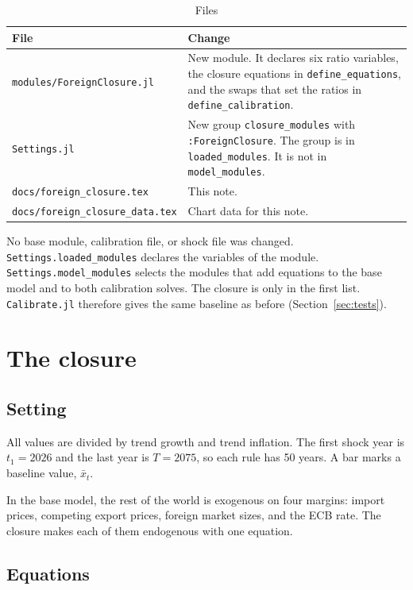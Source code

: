\documentclass[11pt,a4paper]{article}
\newcommand{\code}[1]{\texttt{#1}}
\begin{document}
\begin{table}[H]
\centering
\small
\caption{Files}
\label{tab:files}
\begin{tabular}{@{}lp{9.6cm}@{}}
\toprule
File & Change \\
\midrule
\code{modules/ForeignClosure.jl} & New module. It declares six ratio variables, the closure equations in \code{define\_equations}, and the swaps that set the ratios in \code{define\_calibration}. \\[2pt]
\code{Settings.jl} & New group \code{closure\_modules} with \code{:ForeignClosure}. The group is in \code{loaded\_modules}. It is not in \code{model\_modules}. \\[2pt]
\code{docs/foreign\_closure.tex} & This note. \\[2pt]
\code{docs/foreign\_closure\_data.tex} & Chart data for this note. \\
\bottomrule
\end{tabular}
\end{table}

No base module, calibration file, or shock file was changed.
\code{Settings.loaded\_modules} declares the variables of the module. \code{Settings.model\_modules} selects the modules that add equations to the base model and to both calibration solves. The closure is only in the first list. \code{Calibrate.jl} therefore gives the same baseline as before (Section~\ref{sec:tests}).

\section{The closure}

\subsection{Setting}

All values are divided by trend growth and trend inflation.
The first shock year is $t_1 = 2026$ and the last year is $T = 2075$, so each rule has 50 years.
A bar marks a baseline value, $\bar{x}_t$.

In the base model, the rest of the world is exogenous on four margins: import prices, competing export prices, foreign market sizes, and the ECB rate.
The closure makes each of them endogenous with one equation.

\subsection{Equations}
\end{document}
